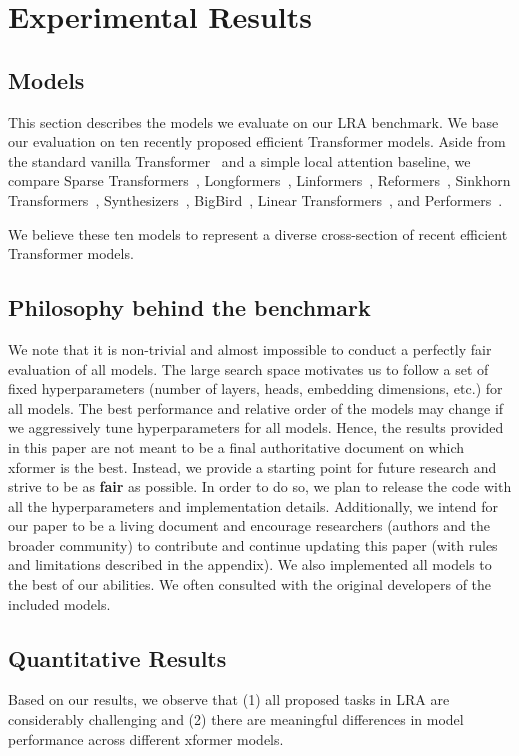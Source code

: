 \documentclass{article} \usepackage{iclr2021_conference,times}
\begin{document}
\section{Experimental Results}
\label{sec:results}

\subsection{Models}
This section describes the models we evaluate on our LRA benchmark. We base our evaluation on ten recently proposed efficient Transformer models. Aside from the standard vanilla Transformer~\citep{vaswani2017attention} and a simple local attention baseline, we compare Sparse Transformers~\citep{child2019generating}, Longformers~\citep{beltagy2020longformer}, Linformers~\citep{wang2020linformer}, Reformers~\citep{kitaev2020reformer}, Sinkhorn Transformers~\citep{tay2020sparse}, Synthesizers~\citep{tay2020synthesizer}, BigBird~\citep{zaheer2020big}, Linear Transformers~\citep{katharopoulos2020transformers}, and Performers~\citep{choromanski2020masked}. 

We believe these ten models to represent a diverse cross-section of recent efficient Transformer models.


\subsection{Philosophy behind the benchmark}
We note that it is non-trivial and almost impossible to conduct a perfectly fair evaluation of all models. The large search space motivates us to follow a set of fixed hyperparameters (number of layers, heads, embedding dimensions, etc.) for all models. The best performance and relative order of the models may change if we aggressively tune hyperparameters for all models. Hence, the results provided in this paper are not meant to be a final authoritative document on which xformer is the best. Instead, we provide a starting point for future research and strive to be as \textbf{fair} as possible. In order to do so, we plan to release the code with all the hyperparameters and implementation details. Additionally, we intend for our paper to be a living document and encourage researchers (authors and the broader community) to contribute and continue updating this paper (with rules and limitations described in the appendix). We also implemented all models to the best of our abilities. We often consulted with the original developers of the included models.

\subsection{Quantitative Results}
Based on our results, we observe that (1) all proposed tasks in LRA are considerably challenging and (2) there are meaningful differences in model performance across different xformer models. 
\end{document}
